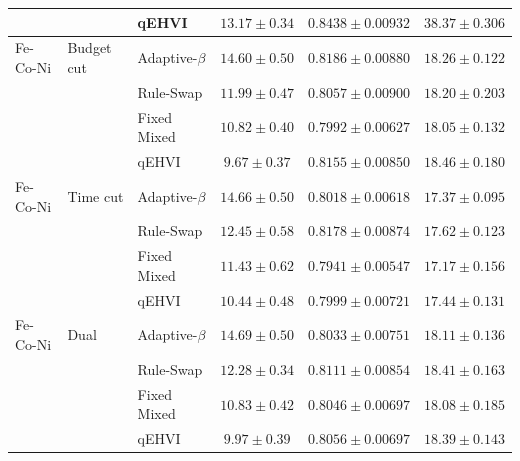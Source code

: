 \begin{tabular}{lllccc}
 &  & qEHVI & $13.17 \pm 0.34$ & $0.8438 \pm 0.00932$ & $38.37 \pm 0.306$ \\
\midrule
Fe-Co-Ni & Budget cut & Adaptive-$\beta$ & $14.60 \pm 0.50$ & $0.8186 \pm 0.00880$ & $18.26 \pm 0.122$ \\
 &  & Rule-Swap & $11.99 \pm 0.47$ & $0.8057 \pm 0.00900$ & $18.20 \pm 0.203$ \\
 &  & Fixed Mixed & $10.82 \pm 0.40$ & $0.7992 \pm 0.00627$ & $18.05 \pm 0.132$ \\
 &  & qEHVI & $9.67 \pm 0.37$ & $0.8155 \pm 0.00850$ & $18.46 \pm 0.180$ \\
\midrule
Fe-Co-Ni & Time cut & Adaptive-$\beta$ & $14.66 \pm 0.50$ & $0.8018 \pm 0.00618$ & $17.37 \pm 0.095$ \\
 &  & Rule-Swap & $12.45 \pm 0.58$ & $0.8178 \pm 0.00874$ & $17.62 \pm 0.123$ \\
 &  & Fixed Mixed & $11.43 \pm 0.62$ & $0.7941 \pm 0.00547$ & $17.17 \pm 0.156$ \\
 &  & qEHVI & $10.44 \pm 0.48$ & $0.7999 \pm 0.00721$ & $17.44 \pm 0.131$ \\
\midrule
Fe-Co-Ni & Dual & Adaptive-$\beta$ & $14.69 \pm 0.50$ & $0.8033 \pm 0.00751$ & $18.11 \pm 0.136$ \\
 &  & Rule-Swap & $12.28 \pm 0.34$ & $0.8111 \pm 0.00854$ & $18.41 \pm 0.163$ \\
 &  & Fixed Mixed & $10.83 \pm 0.42$ & $0.8046 \pm 0.00697$ & $18.08 \pm 0.185$ \\
 &  & qEHVI & $9.97 \pm 0.39$ & $0.8056 \pm 0.00697$ & $18.39 \pm 0.143$ \\
\bottomrule
\end{tabular}
